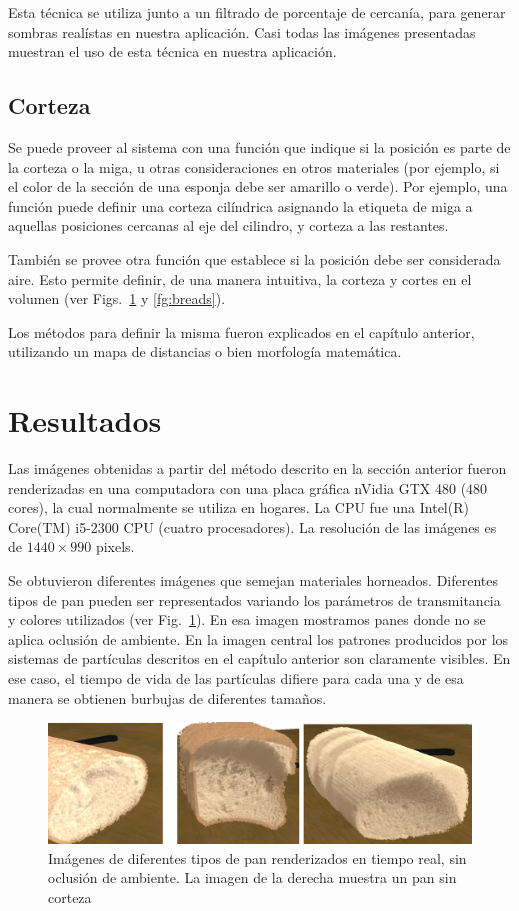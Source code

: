 Esta técnica se utiliza junto a un filtrado de porcentaje de cercanía, para generar sombras realístas en nuestra aplicación.
Casi todas las imágenes presentadas muestran el uso de esta técnica en nuestra aplicación.


\subsection{Corteza}
Se puede proveer al sistema con una función que indique si la posición es parte de la corteza o la miga, u otras consideraciones en otros materiales (por ejemplo, si el color de la sección de una esponja debe ser amarillo o verde).
Por ejemplo, una función puede definir una corteza cilíndrica asignando la etiqueta de miga a aquellas posiciones cercanas al eje del cilindro, y corteza a las restantes.

También se provee otra función que establece si la posición debe ser considerada aire.
Esto permite definir, de una manera intuitiva, la corteza y cortes en el volumen (ver Figs.~\ref{fg:breadsnooc} y \ref{fg:breads}).

Los métodos para definir la misma fueron explicados en el capítulo anterior, utilizando un mapa de distancias o bien morfología matemática.


\section{Resultados}
Las imágenes obtenidas a partir del método descrito en la sección anterior fueron renderizadas en una computadora con una placa gráfica nVidia GTX 480 ($480$ cores), la cual normalmente se utiliza en hogares.
La CPU fue una Intel(R) Core(TM) i5-2300 CPU (cuatro procesadores).
La resolución de las imágenes es de $1440\times990$ pixels. 

Se obtuvieron diferentes imágenes que semejan materiales horneados.
Diferentes tipos de pan pueden ser representados variando los parámetros de transmitancia y colores utilizados (ver Fig.~\ref{fg:breadsnooc}).
En esa imagen mostramos panes donde no se aplica oclusión de ambiente.
En la imagen central los patrones producidos por los sistemas de partículas descritos en el capítulo anterior son claramente visibles.
En ese caso, el tiempo de vida de las partículas difiere para cada una y de esa manera se obtienen burbujas de diferentes tamaños.

\begin{figure}[htb!]
  \centerline{\includegraphics[width=13cm]{fig5}}
  \caption[Imágenes de diferentes tipos de pan renderizados en tiempo real, sin oclusión de ambiente]{Imágenes de diferentes tipos de pan renderizados en tiempo real, sin oclusión de ambiente. La imagen de la derecha muestra un pan sin corteza}
  \label{fg:breadsnooc}
\end{figure}

